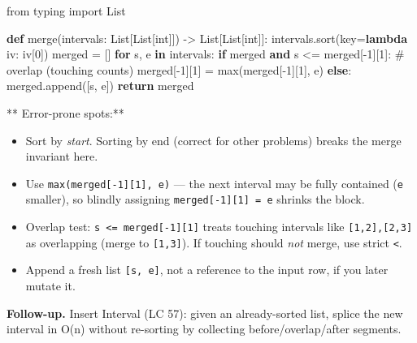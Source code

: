 \documentclass[11pt]{article}
\providecommand{\tightlist}{\setlength{\itemsep}{1pt}\setlength{\parskip}{0pt}}
\newenvironment{Shaded}{\begin{snugshade}}{\end{snugshade}}
\newcommand{\BuiltInTok}[1]{\textcolor[rgb]{0.50,0.55,0.55}{#1}}
\newcommand{\CommentTok}[1]{\textcolor[rgb]{0.48,0.49,0.49}{#1}}
\newcommand{\ControlFlowTok}[1]{\textcolor[rgb]{0.99,0.74,0.29}{\textbf{#1}}}
\newcommand{\DecValTok}[1]{\textcolor[rgb]{0.96,0.45,0.00}{#1}}
\newcommand{\ImportTok}[1]{\textcolor[rgb]{0.15,0.68,0.38}{#1}}
\newcommand{\KeywordTok}[1]{\textcolor[rgb]{0.81,0.81,0.76}{\textbf{#1}}}
\newcommand{\NormalTok}[1]{\textcolor[rgb]{0.81,0.81,0.76}{#1}}
\newcommand{\OperatorTok}[1]{\textcolor[rgb]{0.81,0.81,0.76}{#1}}
\begin{document}

\begin{Shaded}
\begin{Highlighting}[]
\ImportTok{from}\NormalTok{ typing }\ImportTok{import}\NormalTok{ List}

\KeywordTok{def}\NormalTok{ merge(intervals: List[List[}\BuiltInTok{int}\NormalTok{]]) }\OperatorTok{{-}\textgreater{}}\NormalTok{ List[List[}\BuiltInTok{int}\NormalTok{]]:}
\NormalTok{    intervals.sort(key}\OperatorTok{=}\KeywordTok{lambda}\NormalTok{ iv: iv[}\DecValTok{0}\NormalTok{])}
\NormalTok{    merged }\OperatorTok{=}\NormalTok{ []}
    \ControlFlowTok{for}\NormalTok{ s, e }\KeywordTok{in}\NormalTok{ intervals:}
        \ControlFlowTok{if}\NormalTok{ merged }\KeywordTok{and}\NormalTok{ s }\OperatorTok{\textless{}=}\NormalTok{ merged[}\OperatorTok{{-}}\DecValTok{1}\NormalTok{][}\DecValTok{1}\NormalTok{]:    }\CommentTok{\# overlap (touching counts)}
\NormalTok{            merged[}\OperatorTok{{-}}\DecValTok{1}\NormalTok{][}\DecValTok{1}\NormalTok{] }\OperatorTok{=} \BuiltInTok{max}\NormalTok{(merged[}\OperatorTok{{-}}\DecValTok{1}\NormalTok{][}\DecValTok{1}\NormalTok{], e)}
        \ControlFlowTok{else}\NormalTok{:}
\NormalTok{            merged.append([s, e])}
    \ControlFlowTok{return}\NormalTok{ merged}
\end{Highlighting}
\end{Shaded}

** Error-prone spots:**

\begin{itemize}
\tightlist
\item
  Sort by \emph{start}. Sorting by end (correct for other problems) breaks the merge invariant here.
\item
  Use \texttt{max(merged{[}-1{]}{[}1{]},\ e)} --- the next interval may be fully contained (\texttt{e} smaller), so blindly assigning \texttt{merged{[}-1{]}{[}1{]}\ =\ e} shrinks the block.
\item
  Overlap test: \texttt{s\ \textless{}=\ merged{[}-1{]}{[}1{]}} treats touching intervals like \texttt{{[}1,2{]},{[}2,3{]}} as overlapping (merge to \texttt{{[}1,3{]}}). If touching should \emph{not} merge, use strict \texttt{\textless{}}.
\item
  Append a fresh list \texttt{{[}s,\ e{]}}, not a reference to the input row, if you later mutate it.
\end{itemize}

\textbf{Follow-up.} Insert Interval (LC 57): given an already-sorted list, splice the new interval in O(n) without re-sorting by collecting before/overlap/after segments.
\end{document}
